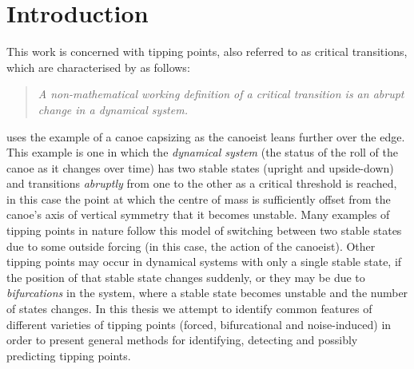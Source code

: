 
\chapter{Introduction}  %
\label{chap:intro}

\graphicspath{{Chap_introduction/Figs/}}



%
%

%

This work is concerned with tipping points, also referred to as critical transitions, which are characterised by \citet{kuehn2011mathematical} as follows:
\begin{quote}
	\emph{
	A non-mathematical working definition of a critical transition is an abrupt change in a dynamical system. }
\end{quote}
\cite{scheffer2009critical} uses the example of a canoe capsizing as the canoeist leans further over the edge. This example is one in which the \emph{dynamical system} (the status of the roll of the canoe as it changes over time) has two stable states (upright and upside-down) and transitions \emph{abruptly} from one to the other as a critical threshold is reached, in this case the point at which the centre of mass is sufficiently offset from the canoe's axis of vertical symmetry that it becomes unstable. {\Red Many examples of tipping points in nature follow this model of switching between two stable states due to some outside forcing (in this case, the action of the canoeist). Other tipping points may occur in dynamical systems with only a single stable state, if the position of that stable state changes suddenly, or they may be due to \emph{bifurcations} in the system, where a stable state becomes unstable and the number of states changes. In this thesis we attempt to identify common features of different varieties of tipping points (forced, bifurcational and noise-induced) in order to present general methods for identifying, detecting and possibly predicting tipping points.}

